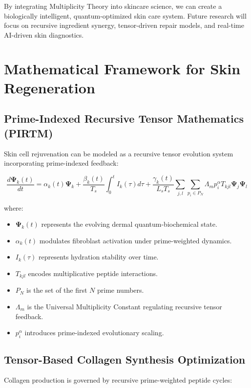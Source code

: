 \documentclass{article}
\theoremstyle{plain}
\theoremstyle{claimstyle}
\begin{document}
By integrating Multiplicity Theory into skincare science, we can create a biologically intelligent, quantum-optimized skin care system. Future research will focus on recursive ingredient synergy, tensor-driven repair models, and real-time AI-driven skin diagnostics.

\section{Mathematical Framework for Skin Regeneration}

\subsection{Prime-Indexed Recursive Tensor Mathematics (PIRTM)}
Skin cell rejuvenation can be modeled as a recursive tensor evolution system incorporating prime-indexed feedback:

\begin{equation}
    \frac{d \bm{\Psi}_k (t)}{dt} = \alpha_k(t) \bm{\Psi}_k + \frac{\beta_k(t)}{T_s} \int_0^t I_k(\tau) d\tau + \frac{\gamma_k(t)}{L_s T_s} \sum_{j,l} \sum_{p_i \in P_N} \Lambda_m p_i^{\alpha} T_{kjl} \bm{\Psi}_j \bm{\Psi}_l
\end{equation}

where:
\begin{itemize}
    \item \( \bm{\Psi}_k (t) \) represents the evolving dermal quantum-biochemical state.
    \item \( \alpha_k(t) \) modulates fibroblast activation under prime-weighted dynamics.
    \item \( I_k(\tau) \) represents hydration stability over time.
    \item \( T_{kjl} \) encodes multiplicative peptide interactions.
    \item \( P_N \) is the set of the first \( N \) prime numbers.
    \item \( \Lambda_m \) is the Universal Multiplicity Constant regulating recursive tensor feedback.
    \item \( p_i^{\alpha} \) introduces prime-indexed evolutionary scaling.
\end{itemize}

\subsection{Tensor-Based Collagen Synthesis Optimization}
Collagen production is governed by recursive prime-weighted peptide cycles:
\end{document}

